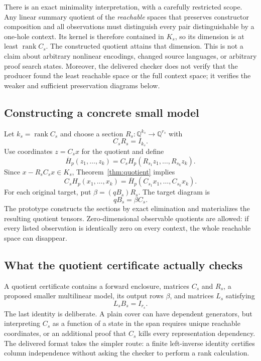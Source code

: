\documentclass[11pt,letterpaper]{article}
\theoremstyle{definition}\newtheorem{definition}[theorem]{Definition}
\theoremstyle{remark}\newtheorem{remark}[theorem]{Remark}
\newcommand{\Q}{\mathbb Q}
\newcommand{\rank}{\operatorname{rank}}
\begin{document}
There is an exact minimality interpretation, with a carefully restricted scope. Any linear summary quotient of the \emph{reachable} spaces that preserves constructor composition and all observations must distinguish every pair distinguishable by a one-hole context. Its kernel is therefore contained in $K_s$, so its dimension is at least $\rank C_s$. The constructed quotient attains that dimension. This is not a claim about arbitrary nonlinear encodings, changed source languages, or arbitrary proof search states. Moreover, the delivered checker does not verify that the producer found the least reachable space or the full context space; it verifies the weaker and sufficient preservation diagrams below.

\subsection{Constructing a concrete small model}
Let $k_s=\rank C_s$ and choose a section $R_s:\Q^{k_s}\to\Q^{r_s}$ with
\begin{equation}\label{eq:section}
 C_sR_s=I_{k_s}.
\end{equation}
Use coordinates $z=C_sx$ for the quotient and define
\begin{equation}\label{eq:qoperation}
 \overline H_p(z_1,\ldots,z_k)
 =C_s H_p(R_{s_1}z_1,\ldots,R_{s_k}z_k).
\end{equation}
Since $x-R_sC_sx\in K_s$, Theorem~\ref{thm:quotient} implies
\begin{equation}\label{eq:qdiagram}
 C_sH_p(x_1,\ldots,x_k)
 =\overline H_p(C_{s_1}x_1,\ldots,C_{s_k}x_k).
\end{equation}
For each original target, put $\beta=(qB_s)R_s$. The target diagram is
\begin{equation}\label{eq:qtarget}
 qB_s=\beta C_s.
\end{equation}
The prototype constructs the sections by exact elimination and materializes the resulting quotient tensors. Zero-dimensional observable quotients are allowed: if every listed observation is identically zero on every context, the whole reachable space can disappear.

\subsection{What the quotient certificate actually checks}
A quotient certificate contains a forward enclosure, matrices $C_s$ and $R_s$, a proposed smaller multilinear model, its output rows $\beta$, and matrices $L_s$ satisfying
\begin{equation}\label{eq:leftinverse}
 L_sB_s=I_{r_s}.
\end{equation}
The last identity is deliberate. A plain cover can have dependent generators, but interpreting $C_s$ as a function of a state in the span requires unique reachable coordinates, or an additional proof that $C_s$ kills every representation dependency. The delivered format takes the simpler route: a finite left-inverse identity certifies column independence without asking the checker to perform a rank calculation.
\end{document}
